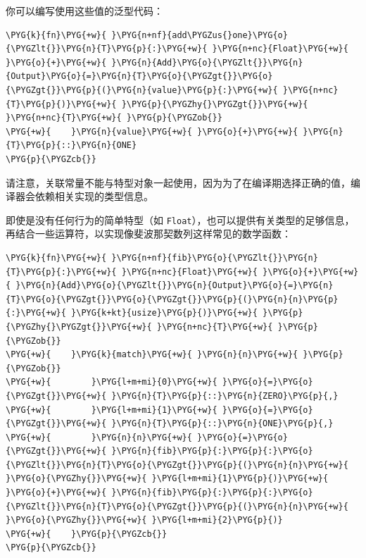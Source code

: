 你可以编写使用这些值的泛型代码：

\begin{Verbatim}[commandchars=\\\{\},breaklines=true,breakanywhere=true,fontsize=\codefont,xleftmargin=17bp]
\PYG{k}{fn}\PYG{+w}{ }\PYG{n+nf}{add\PYGZus{}one}\PYG{o}{\PYGZlt{}}\PYG{n}{T}\PYG{p}{:}\PYG{+w}{ }\PYG{n+nc}{Float}\PYG{+w}{ }\PYG{o}{+}\PYG{+w}{ }\PYG{n}{Add}\PYG{o}{\PYGZlt{}}\PYG{n}{Output}\PYG{o}{=}\PYG{n}{T}\PYG{o}{\PYGZgt{}}\PYG{o}{\PYGZgt{}}\PYG{p}{(}\PYG{n}{value}\PYG{p}{:}\PYG{+w}{ }\PYG{n+nc}{T}\PYG{p}{)}\PYG{+w}{ }\PYG{p}{\PYGZhy{}\PYGZgt{}}\PYG{+w}{ }\PYG{n+nc}{T}\PYG{+w}{ }\PYG{p}{\PYGZob{}}
\PYG{+w}{    }\PYG{n}{value}\PYG{+w}{ }\PYG{o}{+}\PYG{+w}{ }\PYG{n}{T}\PYG{p}{::}\PYG{n}{ONE}
\PYG{p}{\PYGZcb{}}
\end{Verbatim}

请注意，关联常量不能与特型对象一起使用，因为为了在编译期选择正确的值，编译器会依赖相关实现的类型信息。

即使是没有任何行为的简单特型（如 \texttt{Float}），也可以提供有关类型的足够信息，再结合一些运算符，以实现像斐波那契数列这样常见的数学函数：

\begin{Verbatim}[commandchars=\\\{\},breaklines=true,breakanywhere=true,fontsize=\codefont,xleftmargin=17bp]
\PYG{k}{fn}\PYG{+w}{ }\PYG{n+nf}{fib}\PYG{o}{\PYGZlt{}}\PYG{n}{T}\PYG{p}{:}\PYG{+w}{ }\PYG{n+nc}{Float}\PYG{+w}{ }\PYG{o}{+}\PYG{+w}{ }\PYG{n}{Add}\PYG{o}{\PYGZlt{}}\PYG{n}{Output}\PYG{o}{=}\PYG{n}{T}\PYG{o}{\PYGZgt{}}\PYG{o}{\PYGZgt{}}\PYG{p}{(}\PYG{n}{n}\PYG{p}{:}\PYG{+w}{ }\PYG{k+kt}{usize}\PYG{p}{)}\PYG{+w}{ }\PYG{p}{\PYGZhy{}\PYGZgt{}}\PYG{+w}{ }\PYG{n+nc}{T}\PYG{+w}{ }\PYG{p}{\PYGZob{}}
\PYG{+w}{    }\PYG{k}{match}\PYG{+w}{ }\PYG{n}{n}\PYG{+w}{ }\PYG{p}{\PYGZob{}}
\PYG{+w}{        }\PYG{l+m+mi}{0}\PYG{+w}{ }\PYG{o}{=}\PYG{o}{\PYGZgt{}}\PYG{+w}{ }\PYG{n}{T}\PYG{p}{::}\PYG{n}{ZERO}\PYG{p}{,}
\PYG{+w}{        }\PYG{l+m+mi}{1}\PYG{+w}{ }\PYG{o}{=}\PYG{o}{\PYGZgt{}}\PYG{+w}{ }\PYG{n}{T}\PYG{p}{::}\PYG{n}{ONE}\PYG{p}{,}
\PYG{+w}{        }\PYG{n}{n}\PYG{+w}{ }\PYG{o}{=}\PYG{o}{\PYGZgt{}}\PYG{+w}{ }\PYG{n}{fib}\PYG{p}{:}\PYG{p}{:}\PYG{o}{\PYGZlt{}}\PYG{n}{T}\PYG{o}{\PYGZgt{}}\PYG{p}{(}\PYG{n}{n}\PYG{+w}{ }\PYG{o}{\PYGZhy{}}\PYG{+w}{ }\PYG{l+m+mi}{1}\PYG{p}{)}\PYG{+w}{ }\PYG{o}{+}\PYG{+w}{ }\PYG{n}{fib}\PYG{p}{:}\PYG{p}{:}\PYG{o}{\PYGZlt{}}\PYG{n}{T}\PYG{o}{\PYGZgt{}}\PYG{p}{(}\PYG{n}{n}\PYG{+w}{ }\PYG{o}{\PYGZhy{}}\PYG{+w}{ }\PYG{l+m+mi}{2}\PYG{p}{)}
\PYG{+w}{    }\PYG{p}{\PYGZcb{}}
\PYG{p}{\PYGZcb{}}
\end{Verbatim}

